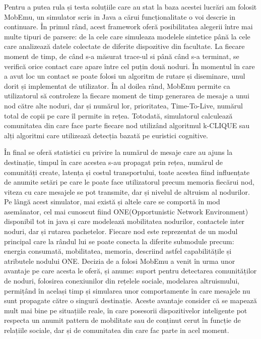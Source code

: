 \documentclass[12pt,a4paper]{report}
\begin{document}
Pentru a putea rula și testa soluțiile care au stat la baza acestei lucrări am folosit MobEmu, un simulator scris in Java a cărui funcționalitate o voi descrie in continuare. În primul rând, acest framework oferă posibilitatea alegerii între mai multe tipuri de parsere: de la cele care simuleaza modelele sintetice până la cele care analizează datele colectate de diferite dispozitive din facultate. La fiecare moment de timp, de când s-a măsurat trace-ul si până când s-a terminat, se verifică orice contact care apare între cel puțin două noduri. În momentul în care a avut loc un contact se poate folosi un algoritm de rutare și diseminare, unul dorit și implementat de utilizator. 
În al doilea rând, MobEmu permite ca utilizatorul să controleze la fiecare moment de timp generarea de mesaje a unui nod către alte noduri, dar și numărul lor, prioritatea, Time-To-Live, numărul total de copii pe care îl permite in rețea. Totodată, simulatorul calculează comunitatea din care face parte fiecare nod utilizând algoritmul k-CLIQUE sau alți algoritmi care utilizează detecția bazată pe euristici cognitive. 

În final se oferă statistici cu privire la numărul de mesaje care au ajuns la destinație, timpul în care acestea s-au propagat prin rețea, numărul de comunități create, latența și costul transportului, toate acestea fiind influențate de anumite setări pe care le poate face utilizatorul precum memoria fiecărui nod, viteza cu care mesajele se pot transmite, dar și nivelul de altruism al nodurilor.
Pe lângă acest simulator, mai există și altele care se comportă în mod asemănator, cel mai cunoscut fiind ONE(Opportunistic Network Environment)~\cite{OneArticle} disponibil tot in java și care modelează mobilitatea nodurilor, contactele inter noduri, dar și rutarea pachetelor. Fiecare nod este reprezentat de un modul principal care la rândul lui se poate conecta la diferite submodule precum: energia consumată, mobilitatea, memoria, descriind astfel capabilitățile și atributele nodului ONE. Decizia de a folosi MobEmu a venit în urma unor avantaje pe care acesta le oferă, și anume: suport pentru detectarea comunităților de noduri, folosirea conexiunilor din rețelele sociale, modelarea altruismului, permițând în același timp și simularea unor comportamente în care mesajele nu sunt propagate către o singură destinație. Aceste avantaje consider că se mapează mult mai bine pe situațiile reale, în care posesorii dispozitivelor inteligente pot respecta un anumit pattern de mobilitate sau de conținut cerut în funcție de relațiile sociale, dar și de comunitatea din care fac parte in acel moment.  
\end{document}
